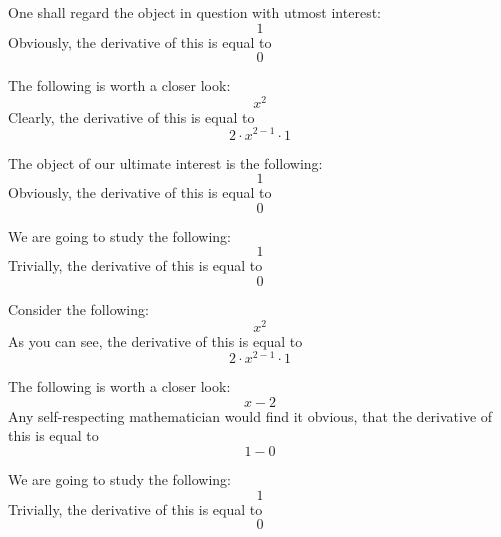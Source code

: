 \documentclass{article}
\begin{document}
One shall regard the object in question with utmost interest:
\begin{equation}
1 
\end{equation}
Obviously, the derivative of this is equal to
\begin{equation}
0 
\end{equation}

The following is worth a closer look:
\begin{equation}
x ^{2 } 
\end{equation}
Clearly, the derivative of this is equal to
\begin{equation}
2 \cdot x ^{2 - 1 } \cdot 1 
\end{equation}

The object of our ultimate interest is the following:
\begin{equation}
1 
\end{equation}
Obviously, the derivative of this is equal to
\begin{equation}
0 
\end{equation}

We are going to study the following:
\begin{equation}
1 
\end{equation}
Trivially, the derivative of this is equal to
\begin{equation}
0 
\end{equation}

Consider the following:
\begin{equation}
x ^{2 } 
\end{equation}
As you can see, the derivative of this is equal to
\begin{equation}
2 \cdot x ^{2 - 1 } \cdot 1 
\end{equation}

The following is worth a closer look:
\begin{equation}
x - 2 
\end{equation}
Any self-respecting mathematician would find it obvious, that the derivative of this is equal to
\begin{equation}
1 - 0 
\end{equation}

We are going to study the following:
\begin{equation}
1 
\end{equation}
Trivially, the derivative of this is equal to
\begin{equation}
0 
\end{equation}
\end{document}
